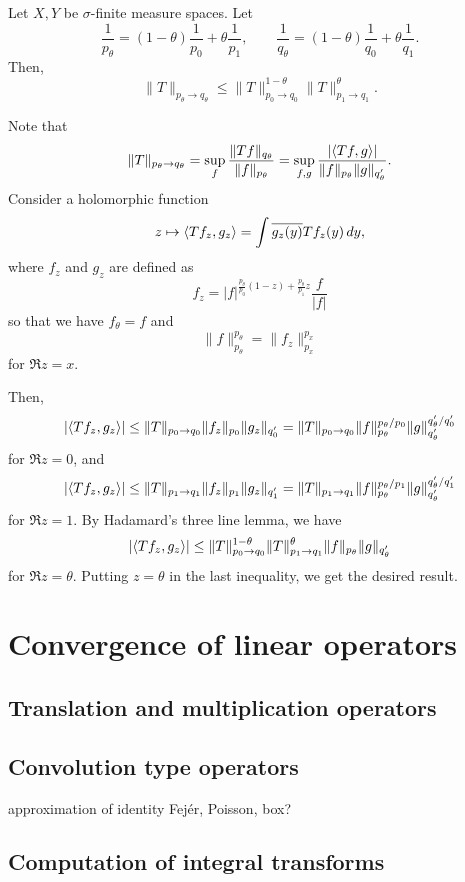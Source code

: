 \documentclass{../../large}
\begin{document}
\begin{prb}
Let $X,Y$ be $\sigma$-finite measure spaces.
Let
\[\frac1{p_\theta}=(1-\theta)\frac1{p_0}+\theta\frac1{p_1},\qquad\frac1{q_\theta}=(1-\theta)\frac1{q_0}+\theta\frac1{q_1}.\]
Then,
\[\|T\|_{p_\theta\to q_\theta}\le\|T\|_{p_0\to q_0}^{1-\theta}\|T\|_{p_1\to q_1}^\theta.\]
\end{prb}
\begin{pf}
Note that
\[\|T\|_{p_\theta\to q_\theta}=\sup_f\frac{\|Tf\|_{q_\theta}}{\|f\|_{p_\theta}}=\sup_{f,g}\frac{|\langle Tf,g\rangle|}{\|f\|_{p_\theta}\|g\|_{q'_\theta}}.\]
Consider a holomorphic function
\[z\mapsto\langle Tf_z,g_z\rangle=\int\overline{g_z(y)}Tf_z(y)\,dy,\]
where $f_z$ and $g_z$ are defined as
\[f_z=|f|^{\frac{p_\theta}{p_0}(1-z)+\frac{p_\theta}{p_1}z}\frac f{|f|}\]
so that we have $f_\theta=f$ and
\[\|f\|_{p_\theta}^{p_\theta}=\|f_z\|_{p_x}^{p_x}\]
for $\Re z=x$.

Then,
\[|\langle Tf_z,g_z\rangle|\le\|T\|_{p_0\to q_0}\|f_z\|_{p_0}\|g_z\|_{q'_0}=\|T\|_{p_0\to q_0}\|f\|_{p_\theta}^{p_\theta/p_0}\|g\|_{q'_\theta}^{q'_\theta/q'_0}\]
for $\Re z=0$, and
\[|\langle Tf_z,g_z\rangle|\le\|T\|_{p_1\to q_1}\|f_z\|_{p_1}\|g_z\|_{q'_1}=\|T\|_{p_1\to q_1}\|f\|_{p_\theta}^{p_\theta/p_1}\|g\|_{q'_\theta}^{q'_\theta/q'_1}\]
for $\Re z=1$.
By Hadamard's three line lemma, we have
\[|\langle Tf_z,g_z\rangle|\le\|T\|_{p_0\to q_0}^{1-\theta}\|T\|_{p_1\to q_1}^\theta\|f\|_{p_\theta}\|g\|_{q'_\theta}\]
for $\Re z=\theta$.
Putting $z=\theta$ in the last inequality, we get the desired result.
\end{pf}




\chapter{Convergence of linear operators}
\section{Translation and multiplication operators}

\section{Convolution type operators}
approximation of identity
Fej\'er, Poisson, box?

\section{Computation of integral transforms}
\end{document}
